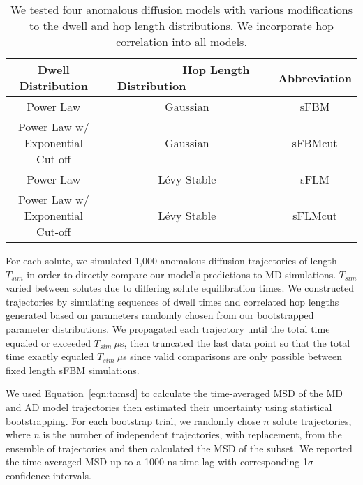 \documentclass[journal=ancac3,manuscript=article,layout=twocolumn]{achemso}
\begin{document}
  \begin{table*}[!htb]
	  \centering
	  \begin{tabular}{ccc}
            \hline
	  \hline
	  Dwell Distribution                & ~~~~~~~~~Hop Length Distribution~~~~~~~~~~~ & Abbreviation \\
	  \hline
      Power Law                         & Gaussian                & sFBM         \\
      Power Law w/ Exponential Cut-off  & Gaussian                & sFBMcut      \\
      Power Law                         & L\'evy Stable           & sFLM         \\
      Power Law w/ Exponential Cut-off  & L\'evy Stable           & sFLMcut      \\
	  \hline
          \hline
	  \end{tabular}
	  \caption{We tested four anomalous diffusion models with various modifications 
	  to the dwell and hop length distributions. We incorporate hop correlation 
	  into all models.}\label{table:anomalous_models}
          
 \end{table*}

  For each solute, we simulated 1,000 anomalous diffusion trajectories of
  length $T_{sim}$ in order to directly compare our model's predictions to MD
  simulations. $T_{sim}$ varied between solutes due to differing solute
  equilibration times. We constructed trajectories by simulating sequences of
  dwell times and correlated hop lengths generated based on parameters randomly
  chosen from our bootstrapped parameter distributions. We propagated each
  trajectory until the total time equaled or exceeded $T_{sim}~ \mu$s, then
  truncated the last data point so that the total time exactly equaled
  $T_{sim}~ \mu$s since valid comparisons are only possible between fixed
  length sFBM simulations. 
  
  We used Equation~\ref{eqn:tamsd} to calculate the time-averaged MSD of the MD
  and AD model trajectories then estimated their uncertainty using statistical
  bootstrapping. For each bootstrap trial, we randomly chose $n$ solute
  trajectories, where $n$ is the number of independent trajectories, with
  replacement, from the ensemble of trajectories and then calculated the MSD of
  the subset. We reported the time-averaged MSD up to a 1000 ns time lag with
  corresponding 1$\sigma$ confidence intervals. 
\end{document}
